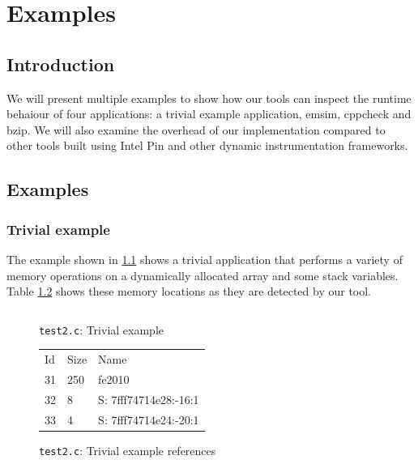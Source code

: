 \chapter{Examples}

\section {Introduction}

We will present multiple examples to show how our tools can inspect the runtime behaiour of four applications: a trivial example application, emsim, cppcheck and bzip. We will also examine the overhead of our implementation compared to other tools built using Intel Pin and other dynamic instrumentation frameworks.

\section{Examples}

\subsection{Trivial example}

The example shown in \ref{cap4:test2} shows a trivial application that performs a variety of memory operations on a dynamically allocated array and some stack variables. Table \ref{cap4:test2references} shows these memory locations as they are detected by our tool.

\begin{figure}
	\begin{center}
		\inputminted[linenos, fontsize=\scriptsize]{c}{test2.c}
	\end{center}
	\caption{\texttt{test2.c}: Trivial example}
	\label{cap4:test2}
\end{figure}

\begin{figure}
	\begin{center}
		\begin{tabular}{l l l}
			Id & Size & Name \\
			31 & 250 & fe2010 \\
			32 & 8 & S: 7fff74714e28:-16:1 \\
			33 & 4 & S: 7fff74714e24:-20:1 \\
		\end{tabular}
	\end{center}
	\caption{\texttt{test2.c}: Trivial example references}
	\label{cap4:test2references}
\end{figure}

